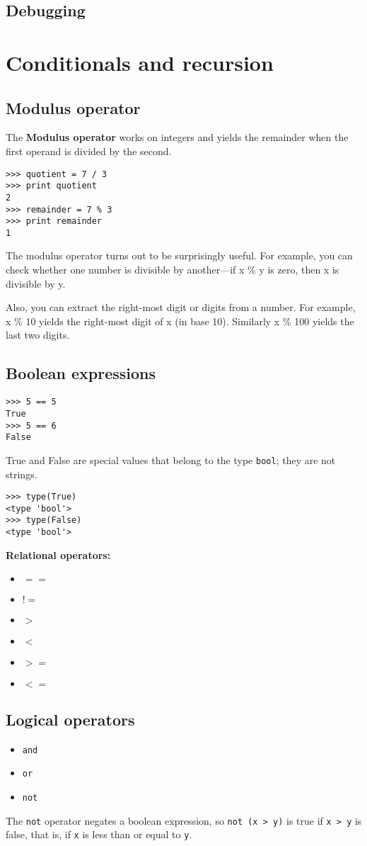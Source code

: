 \documentclass{article}
\begin{document}
\subsection{Debugging}

\section{Conditionals and recursion}
\subsection{Modulus operator}
The \textbf{Modulus operator} works on integers and yields the remainder
when the first operand is divided by the second.
\begin{lstlisting}
>>> quotient = 7 / 3
>>> print quotient
2
>>> remainder = 7 % 3
>>> print remainder
1
\end{lstlisting}
The modulus operator turns out to be surprisingly useful. For example,
you can check whether one number is divisible by another—if x \% y is
zero, then x is divisible by y.

Also, you can extract the right-most digit or digits from a number.
For example, x \% 10 yields the right-most digit of x (in base 10).
Similarly x \% 100 yields the last two digits.

\subsection{Boolean expressions}
\begin{lstlisting}
>>> 5 == 5
True
>>> 5 == 6
False
\end{lstlisting}
True and False are special values that belong to the type
\verb|bool|; they are not strings.
\begin{lstlisting}
>>> type(True)
<type 'bool'>
>>> type(False)
<type 'bool'>
\end{lstlisting}

\textbf{Relational operators:}
\begin{itemize}
    \item $==$
    \item $!=$
    \item $>$
    \item $<$
    \item $>=$
    \item $<=$
\end{itemize}

\subsection{Logical operators}
\begin{itemize}
    \item \verb|and|
    \item \verb|or|
    \item \verb|not|
\end{itemize}
The \verb|not| operator negates a boolean expression, so
\verb|not (x > y)| is true if \verb|x > y| is false, that is, if
\verb|x| is less than or equal to \verb|y|.
\end{document}
